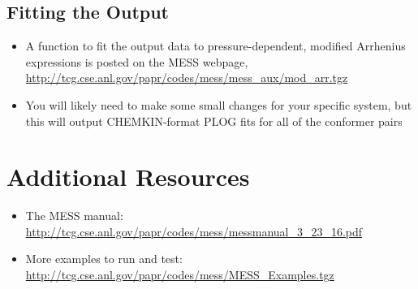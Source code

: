 \documentclass[a4paper,10pt]{article}
\begin{document}
\subsection{Fitting the Output}
  \begin{itemize}
   \item A function to fit the output data to pressure-dependent, modified Arrhenius expressions is posted on the \textsc{MESS} webpage, \url{http://tcg.cse.anl.gov/papr/codes/mess/mess_aux/mod_arr.tgz}
   \item You will likely need to make some small changes for your specific system, but this will output \textsc{CHEMKIN}-format \textsc{PLOG} fits for all of the conformer pairs
  \end{itemize}


\section{Additional Resources}
  \begin{itemize}
   \item The \textsc{MESS} manual: \url{http://tcg.cse.anl.gov/papr/codes/mess/messmanual_3_23_16.pdf}
   \item More examples to run and test: \url{http://tcg.cse.anl.gov/papr/codes/mess/MESS_Examples.tgz}
  \end{itemize}



 

\end{document}
